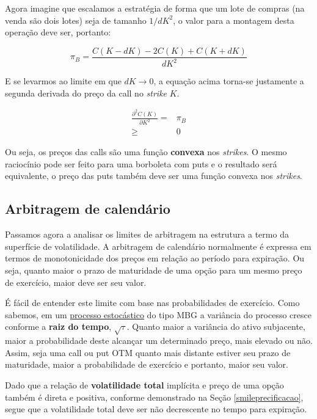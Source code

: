 \documentclass[]{book}
\theoremstyle{definition}
\theoremstyle{definition}
\theoremstyle{definition}
\theoremstyle{remark}
\begin{document}
Agora imagine que escalamos a estratégia de forma que um lote de compras (na venda são dois lotes) seja de tamanho \(1/dK^2\), o valor para a montagem desta operação deve ser, portanto:

\begin{equation}
\pi_B=\frac{C(K-dK)-2C(K)+C(K+dK)}{dK^2}
\end{equation}

E se levarmos ao limite em que \(dK\rightarrow 0\), a equação acima torna-se justamente a segunda derivada do preço da call no \emph{strike} \(K\).

\begin{equation}
\begin{aligned}
\frac{\partial^2 C(K)}{\partial K^2}=& \pi_B\\
\geq & 0
\end{aligned}
\label{eq:arbborboleta}
\end{equation}

Ou seja, os preços das calls são uma função \textbf{convexa} nos \emph{strikes}. O mesmo raciocínio pode ser feito para uma borboleta com puts e o resultado será equivalente, o preço das puts também deve ser uma função convexa nos \emph{strikes}.

\hypertarget{arbitragem-de-calendario}{%
\subsection{Arbitragem de calendário}\label{arbitragem-de-calendario}}

Passamos agora a analisar os limites de arbitragem na estrutura a termo da superfície de volatilidade. A arbitragem de calendário normalmente é expressa em termos de monotonicidade dos preços em relação ao período para expiração. Ou seja, quanto maior o prazo de maturidade de uma opção para um mesmo preço de exercício, maior deve ser seu valor.

É fácil de entender este limite com base nas probabilidades de exercício. Como sabemos, em um \protect\hyperlink{processos-estocasticos}{processo estocástico} do tipo MBG a variância do processo cresce conforme a \textbf{raiz do tempo}, \(\sqrt{\tau}\). Quanto maior a variância do ativo subjacente, maior a probabilidade deste alcançar um determinado preço, mais elevado ou não. Assim, seja uma call ou put OTM quanto mais distante estiver seu prazo de maturidade, maior a probabilidade de exercício e portanto, maior seu valor.

Dado que a relação de \textbf{volatilidade total} implícita e preço de uma opção também é direta e positiva, conforme demonstrado na Seção \ref{smileprecificacao}, segue que a volatilidade total deve ser não decrescente no tempo para expiração.
\end{document}

